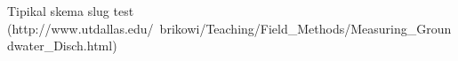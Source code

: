 Tipikal skema slug test (http://www.utdallas.edu/~brikowi/Teaching/Field_Methods/Measuring_Groundwater_Disch.html)